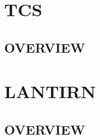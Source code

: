\documentclass[8pt,usenames,dvipsnames,twoside]{article}
\begin{document}
		\cleardoublepage
		
		\section{TCS}
		
		\subsection{OVERVIEW}
		
		\cleardoublepage
		
		\section{LANTIRN}
		
		\subsection{OVERVIEW}
\end{document}
